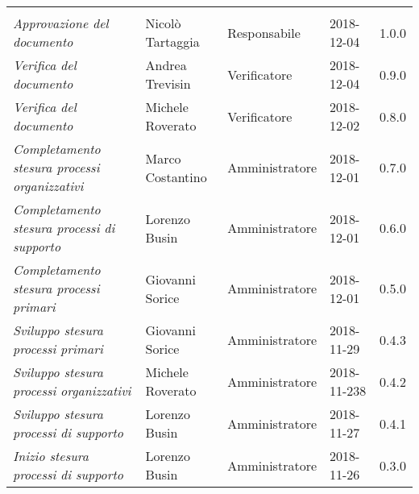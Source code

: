 \newpage 
\section*{}
\begin{table}[H]
	\centering
	\begin{tabular}{p{4cm}|C{3cm}|C{3cm}|R{2.5cm}|R{2cm}}
		
		 & & & & \\
		
		
		\emph{Approvazione del documento} & Nicolò Tartaggia & Responsabile & 2018-12-04 & 1.0.0 \\
		\hline
		
		\emph{Verifica del documento} & Andrea Trevisin & Verificatore & 2018-12-04 & 0.9.0 \\
		\hline
		
		\emph{Verifica del documento} & Michele Roverato & Verificatore & 2018-12-02 & 0.8.0 \\
		\hline
		
		\emph{Completamento stesura processi organizzativi} & Marco Costantino & Amministratore & 2018-12-01 & 0.7.0 \\
		\hline
		
		\emph{Completamento stesura processi di supporto} & Lorenzo Busin & Amministratore & 2018-12-01 & 0.6.0 \\
		\hline
		
		\emph{Completamento stesura processi primari} & Giovanni Sorice & Amministratore & 2018-12-01 & 0.5.0 \\
		\hline
		
		\emph{Sviluppo stesura processi primari} & Giovanni Sorice & Amministratore & 2018-11-29 & 0.4.3 \\
		\hline
		
		\emph{Sviluppo stesura processi organizzativi} & Michele Roverato & Amministratore & 2018-11-238 & 0.4.2 \\
		\hline
		
		\emph{Sviluppo stesura processi di supporto} & Lorenzo Busin & Amministratore & 2018-11-27 & 0.4.1 \\
		\hline
		
		\emph{Inizio stesura processi di supporto} & Lorenzo Busin & Amministratore & 2018-11-26 & 0.3.0 \\
		\hline
		

\end{tabular}
\end{table}
